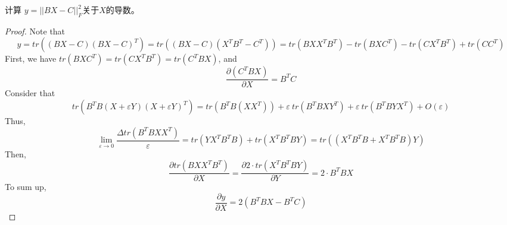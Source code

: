 \documentclass[11pt,fleqn]{book} %
\begin{document}
\begin{CJK}{UTF8}{gkai}
\begin{example}
    计算 $y = ||BX - C||_F^2$关于$X$的导数。
\end{example}
\begin{proof}
    Note that 
    \[
        y = tr\left((BX - C)(BX-C)^T\right) = tr\left((BX-C)(X^TB^T-C^T)\right) = tr\left(BXX^TB^T\right) - tr\left(BXC^T\right) - tr\left(CX^TB^T\right) + tr\left(CC^T\right)\]   
    First, we have $tr\left(BXC^T\right) = tr\left(CX^TB^T\right) = tr\left(C^TBX\right)$, and 
    \[
        \frac{\partial (C^TBX)}{\partial X} = B^TC\]
    Consider that 
    \[
        tr\left(B^TB(X + \varepsilon Y)(X + \varepsilon Y)^T\right) = tr\left(B^TB(XX^T)\right) + \varepsilon \ tr\left(B^TBXY^T\right) + \varepsilon \ tr\left(B^TBYX^T\right) + O(\varepsilon)
        \]
    Thus, 
    \[
        \lim_{\varepsilon \to 0} \frac {\Delta tr(B^TBXX^T)}{\varepsilon} = tr(YX^TB^TB) + tr(X^TB^TBY) = tr\left((X^TB^TB+X^TB^TB)Y\right)\]
    Then,
    \[
        \frac{\partial tr\left(BXX^TB^T\right)}{\partial X} = \frac{\partial 2\cdot tr\left(X^TB^TBY\right)}{\partial Y} = 2 \cdot B^TBX \]
    To sum up, 
    \[
        \frac{\partial y}{\partial X} = 2(B^TBX - B^TC)\]
\end{proof}

\end{CJK}
\end{document}
